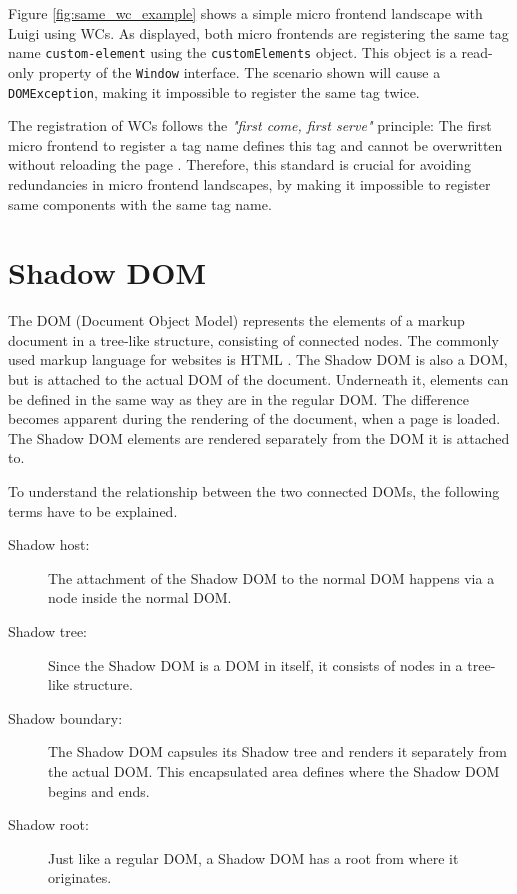 Figure \ref{fig:same_wc_example} shows a simple micro frontend landscape with Luigi using WCs. As displayed, both micro frontends are registering the same tag name \texttt{custom-element} using the \texttt{customElements} object. This object is a read-only property of the \texttt{Window} interface.
The scenario shown will cause a  \texttt{DOMException}, making it impossible to register the same tag twice.

The registration of WCs follows the \textit{"first come, first serve"} principle: The first micro frontend to register a tag name defines this tag and cannot be overwritten without reloading the page \cite{mdn_web_docs_define}.
Therefore, this standard is crucial for avoiding redundancies in micro frontend landscapes, by making it impossible to register same components with the same tag name.

\section{Shadow DOM}

The DOM (Document Object Model) represents the elements of a markup document in a tree-like structure, consisting of connected nodes. The commonly used markup language for websites is HTML  \cite{wc_shadow_dom}.
The Shadow DOM is also a DOM, but is attached to the actual DOM of the document. Underneath it, elements can be defined in the same way as they are in the regular DOM. The difference becomes apparent during the rendering of the document, when a page is loaded. The Shadow DOM elements are rendered separately from the DOM it is attached to.\cite{simon_thesis}

To understand the relationship between the two connected DOMs, the following terms have to be explained.

\begin{description}
	\item[Shadow host:] The attachment of the Shadow DOM to the normal DOM happens via a node inside the normal DOM.
	\item[Shadow tree:] Since the Shadow DOM is a DOM in itself, it consists of nodes in a tree-like structure.
	\item[Shadow boundary:] The Shadow DOM capsules its Shadow tree and renders it separately from the actual DOM. This encapsulated area defines where the Shadow DOM begins and ends.
	\item[Shadow root:] Just like a regular DOM, a Shadow DOM has a root from where it originates.
\end{description}

